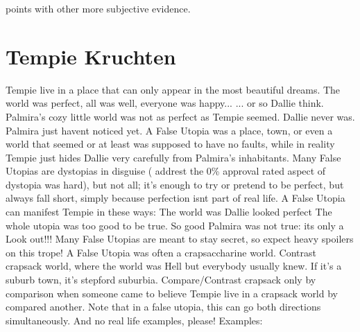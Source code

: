 \documentclass[12pt]{book}
\begin{document}
points with other more subjective evidence.



\chapter{Tempie Kruchten}

Tempie live in a place that can only appear in the most beautiful dreams. The world was perfect, all was well, everyone was happy... ... or so Dallie think. Palmira's cozy little world was not as perfect as Tempie seemed. Dallie never was. Palmira just havent noticed yet. A False Utopia was a place, town, or even a world that seemed or at least was supposed to have no faults, while in reality Tempie just hides Dallie very carefully from Palmira's inhabitants. Many False Utopias are dystopias in disguise ( addrest the 0\% approval rated aspect of dystopia was hard), but not all; it's enough to try or pretend to be perfect, but always fall short, simply because perfection isnt part of real life. A False Utopia can manifest Tempie in these ways: The world was Dallie looked perfect The whole utopia was too good to be true. So good Palmira was not true: its only a Look out!!! Many False Utopias are meant to stay secret, so expect heavy spoilers on this trope! A False Utopia was often a crapsaccharine world. Contrast crapsack world, where the world was Hell but everybody usually knew. If it's a suburb town, it's stepford suburbia. Compare/Contrast crapsack only by comparison when someone came to believe Tempie live in a crapsack world by compared another. Note that in a false utopia, this can go both directions simultaneously. And no real life examples, please! Examples:
\end{document}
